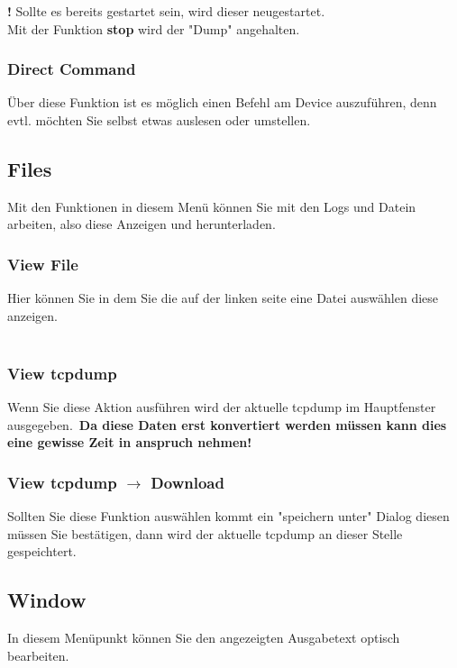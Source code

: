\documentclass[11pt]{article} %
\begin{document}
\textbf{!} Sollte es bereits gestartet sein, wird dieser neugestartet.\\
Mit der Funktion \textbf{stop} wird der "Dump" angehalten. \\
\color{black}
\subsubsection{Direct Command}
Über diese Funktion ist es möglich einen Befehl am Device auszuführen, denn evtl. möchten Sie selbst etwas auslesen oder umstellen.\\
\color{black}
\pagebreak
\subsection{Files}
Mit den Funktionen in diesem Menü können Sie mit den Logs und Datein arbeiten, also diese Anzeigen und herunterladen.\\
\subsubsection{View File}
Hier können Sie in dem Sie die auf der linken seite eine Datei auswählen diese anzeigen.\\
\color{black}
\\
\subsubsection{View tcpdump}
Wenn Sie diese Aktion ausführen wird der aktuelle tcpdump im Hauptfenster ausgegeben.\
\textbf{Da diese Daten erst konvertiert werden müssen kann dies eine gewisse Zeit in anspruch nehmen!}
\color{green}{\textbf{Bild}}\color{black}
\\
\subsubsection{View tcpdump $\rightarrow$ Download}
Sollten Sie diese Funktion auswählen kommt ein "speichern unter" Dialog diesen müssen Sie bestätigen, dann wird der aktuelle tcpdump an dieser Stelle gespeichtert.
\color{green}{\textbf{Bild}}\color{black}
\\
\pagebreak
\subsection{Window}
In diesem Menüpunkt können Sie den angezeigten Ausgabetext optisch bearbeiten.\\
\color{green}{\textbf{Bild}}\color{black}
\end{document}
